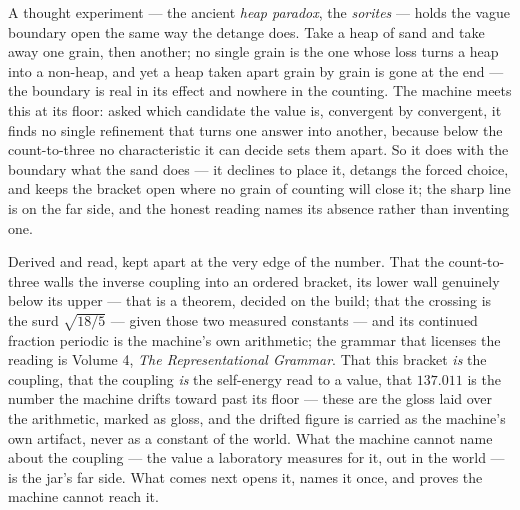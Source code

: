 A thought experiment --- the ancient \emph{heap paradox}, the \emph{sorites} --- holds the vague boundary open the same
way the detange does.
Take a heap of sand and take away one grain, then another; no single grain is the one whose loss turns a heap into a
non-heap, and yet a heap taken apart grain by grain is gone at the end --- the boundary is real in its effect and nowhere
in the counting.
The machine meets this at its floor: asked which candidate the value is, convergent by convergent, it finds no single
refinement that turns one answer into another, because below the count-to-three no characteristic it can decide sets them
apart.
So it does with the boundary what the sand does --- it declines to place it, detangs the forced choice, and keeps the
bracket open where no grain of counting will close it; the sharp line is on the far side, and the honest reading names its
absence rather than inventing one.

Derived and read, kept apart at the very edge of the number.
That the count-to-three walls the inverse coupling into an ordered bracket, its lower wall genuinely below its upper ---
that is a theorem, decided on the build; that the crossing is the surd $\sqrt{18/5}$ --- given those two measured constants --- and its continued fraction periodic
is the machine's own arithmetic; the grammar that licenses the reading is Volume 4, \emph{The Representational Grammar}.
That this bracket \emph{is} the coupling, that the coupling \emph{is} the self-energy read to a value, that $137.011$ is
the number the machine drifts toward past its floor --- these are the gloss laid over the arithmetic, marked as
gloss, and the drifted figure is carried as the machine's own artifact, never as a constant of the world.
What the machine cannot name about the coupling --- the value a laboratory measures for it, out in the world --- is the
jar's far side.
What comes next opens it, names it once, and proves the machine cannot reach it.
